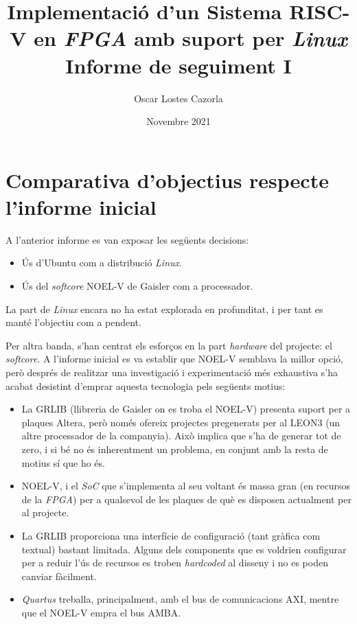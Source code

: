 \documentclass{article}
\begin{document}
\nocite{*}

\title{\textbf{Implementació d'un Sistema RISC-V en \textit{FPGA} amb suport per \textit{Linux}} \\
Informe de seguiment I}
\author{Oscar Lostes Cazorla}
\date{Novembre 2021}

\clearpage\maketitle
\thispagestyle{empty}

\newpage

\section{Comparativa d'objectius respecte l'informe inicial}

A l'anterior informe es van exposar les següents decisions:
\begin{itemize}
\item Ús d'Ubuntu com a distribució \textit{Linux}.
\item Ús del \textit{softcore} NOEL-V de Gaisler com a processador.
\end{itemize}

La part de \textit{Linux} encara no ha estat explorada en profunditat, i per tant es manté l'objectiu com a pendent.

Per altra banda, s'han centrat els esforços en la part \textit{hardware} del projecte: el \textit{softcore}. A l'informe inicial es va establir que NOEL-V semblava la millor opció, però després de realitzar una investigació i experimentació més exhaustiva s'ha acabat desistint d'emprar aquesta tecnologia pels següents motius:

\begin{itemize}
\item La GRLIB (llibreria de Gaisler on es troba el NOEL-V) presenta suport per a plaques Altera, però només ofereix projectes pregenerats per al LEON3 (un altre processador de la companyia).
Això implica que s'ha de generar tot de zero, i si bé no és inherentment un problema, en conjunt amb la resta de motius sí que ho és.
\item NOEL-V, i el \textit{SoC} que s'implementa al seu voltant és massa gran (en recursos de la \textit{FPGA}) per a qualsevol de les plaques de què es disposen actualment per al projecte.
\item La GRLIB proporciona una interfície de configuració (tant gràfica com textual) bastant limitada. Alguns dels components que es voldrien configurar per a reduir l'ús de recursos es troben \textit{hardcoded} al disseny i no es poden canviar fàcilment.
\item \textit{Quartus} treballa, principalment, amb el bus de comunicacions AXI, mentre que el NOEL-V empra el bus AMBA.
\end{itemize}
\end{document}

